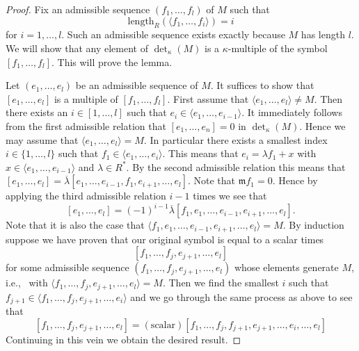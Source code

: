 \documentclass[10pt,a4paper]{amsart}
\theoremstyle{plain}
\theoremstyle{definition}
\theoremstyle{remark}
\numberwithin{equation}{subsection}
\begin{document}
\begin{proof}
Fix an admissible sequence $(f_1, \ldots, f_l)$ of $M$ such that
$$
\text{length}_R(\langle f_1, \ldots, f_i\rangle) = i
$$
for $i = 1, \ldots, l$. Such an admissible sequence exists exactly because
$M$ has length $l$. We will show that any element of
$\det_\kappa(M)$ is a $\kappa$-multiple of the symbol
$[f_1, \ldots, f_l]$. This will prove the lemma.

\medskip\noindent
Let $(e_1, \ldots, e_l)$ be an admissible sequence of $M$.
It suffices to show that $[e_1, \ldots, e_l]$ is a multiple
of $[f_1, \ldots, f_l]$. First assume that
$\langle e_1, \ldots, e_l\rangle \not = M$. Then there exists
an $i \in [1, \ldots, l]$ such that
$e_i \in \langle e_1, \ldots, e_{i - 1}\rangle$. It immediately
follows from the first admissible relation that
$[e_1, \ldots, e_n] = 0$ in $\det_\kappa(M)$.
Hence we may assume that $\langle e_1, \ldots, e_l\rangle = M$.
In particular there exists a smallest index $i \in \{1, \ldots, l\}$
such that $f_1 \in \langle e_1, \ldots, e_i\rangle$. This means
that $e_i = \lambda f_1 + x$ with
$x \in \langle e_1, \ldots, e_{i - 1}\rangle$ and $\lambda \in R^*$.
By the second admissible relation this means that
$[e_1, \ldots, e_l] =
\overline{\lambda}[e_1, \ldots, e_{i - 1}, f_1, e_{i + 1}, \ldots, e_l]$.
Note that $\mathfrak m f_1 = 0$. Hence by applying the third
admissible relation $i - 1$ times we see that
$$
[e_1, \ldots, e_l] =
(-1)^{i - 1}\overline{\lambda}
[f_1, e_1, \ldots, e_{i - 1}, e_{i + 1}, \ldots, e_l].
$$
Note that it is also the case that
$ \langle f_1, e_1, \ldots, e_{i - 1}, e_{i + 1}, \ldots, e_l\rangle = M$.
By induction suppose we have proven that our original
symbol is equal to a scalar times
$$
[f_1, \ldots, f_j, e_{j + 1}, \ldots, e_l]
$$
for some admissible sequence $(f_1, \ldots, f_j, e_{j + 1}, \ldots, e_l)$
whose elements generate $M$, i.e., \ with
$\langle f_1, \ldots, f_j, e_{j + 1}, \ldots, e_l\rangle = M$.
Then we find the smallest $i$ such that
$f_{j + 1} \in \langle f_1, \ldots, f_j, e_{j + 1}, \ldots, e_i\rangle$
and we go through the same process as above to see that
$$
[f_1, \ldots, f_j, e_{j + 1}, \ldots, e_l]
=
(\text{scalar}) [f_1, \ldots, f_j, f_{j + 1}, e_{j + 1},
\ldots, \hat{e_i}, \ldots, e_l]
$$
Continuing in this vein we obtain the desired result.
\end{proof}
\end{document}

